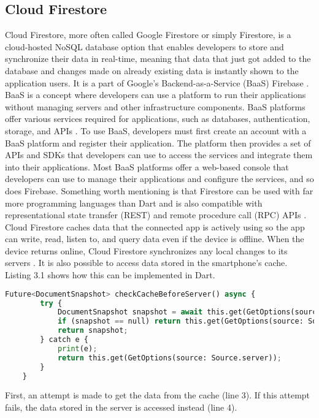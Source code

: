 \subsection{Cloud Firestore}
Cloud Firestore, more often called Google Firestore or simply Firestore, is a cloud-hosted NoSQL database option that enables developers to store and synchronize their data in real-time, meaning that data that just got added to the database and changes made on already existing data is instantly shown to the application users. It is a part of Google's Backend-as-a-Service (BaaS) Firebase \cite[p. 458 ]{.baasfirebase}. BaaS is a concept where developers can use a platform to run their applications without managing servers and other infrastructure components. BaaS platforms offer various services required for applications, such as databases, authentication, storage, and APIs \cite{.baasokta}. To use BaaS, developers must first create an account with a BaaS platform and register their application. The platform then provides a set of APIs and SDKs that developers can use to access the services and integrate them into their applications. Most BaaS platforms offer a web-based console that developers can use to manage their applications and configure the services, and so does Firebase. Something worth mentioning is that Firestore can be used with far more programming languages than Dart and is also compatible with representational state transfer (REST) and remote procedure call (RPC) APIs \cite{.firestore}.
\newline \\
Cloud Firestore caches data that the connected app is actively using so the app can write, read, listen to, and query data even if the device is offline. When the device returns online, Cloud Firestore synchronizes any local changes to its servers \cite{.firestore}. It is also possible to access data stored in the smartphone's cache. Listing 3.1 shows how this can be implemented in Dart.
\pagebreak
\begin{lstlisting}[language=Python, caption={Firestore and Dart - getting Cache-data}]
	Future<DocumentSnapshot> checkCacheBeforeServer() async {
		try {
			DocumentSnapshot snapshot = await this.get(GetOptions(source: Source.cache));
			if (snapshot == null) return this.get(GetOptions(source: Source.server));
			return snapshot;
		} catch e {
			print(e);
			return this.get(GetOptions(source: Source.server));
		}
	}	
\end{lstlisting}
\noindent
First, an attempt is made to get the data from the cache (line 3). If this attempt fails, the data stored in the server is accessed instead (line 4).


